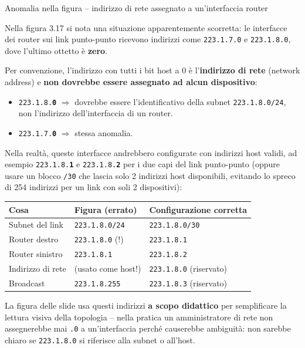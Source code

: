 \documentclass[a4paper,12pt]{report}
\begin{document}
\begin{notebox}{Anomalia nella figura -- indirizzo di rete
assegnato a un'interfaccia router}

Nella figura {3.17} si nota una situazione
apparentemente scorretta: le interfacce dei router sui link
punto-punto ricevono indirizzi come \texttt{223.1.7.0} e
\texttt{223.1.8.0}, dove l'ultimo ottetto è \textbf{zero}.

Per convenzione, l'indirizzo con tutti i bit host a 0 è
l'\textbf{indirizzo di rete} (network address) e
\textbf{non dovrebbe essere assegnato ad alcun dispositivo}:
\begin{itemize}
    \item \texttt{223.1.8.\textbf{0}} $\Rightarrow$ dovrebbe
          essere l'identificativo della subnet
          \texttt{223.1.8.0/24}, non l'indirizzo
          dell'interfaccia di un router.
    \item \texttt{223.1.7.\textbf{0}} $\Rightarrow$ stessa
          anomalia.
\end{itemize}

Nella realtà, queste interfacce andrebbero configurate con
indirizzi host validi, ad esempio \texttt{223.1.8.\textbf{1}}
e \texttt{223.1.8.\textbf{2}} per i due capi del link
punto-punto (oppure usare un blocco \texttt{/30} che lascia
solo 2 indirizzi host disponibili, evitando lo spreco di 254
indirizzi per un link con soli 2 dispositivi):

\begin{center}
\begin{tabular}{lll}
\toprule
\textbf{Cosa} & \textbf{Figura (errato)} &
\textbf{Configurazione corretta} \\
\midrule
Subnet del link    & \texttt{223.1.8.0/24}
                   & \texttt{223.1.8.0/30} \\
Router destro    & \texttt{223.1.8.0} (!)
                   & \texttt{223.1.8.1} \\
Router sinistro      & \texttt{223.1.8.1}
                   & \texttt{223.1.8.2} \\
Indirizzo di rete  & (usato come host!)
                   & \texttt{223.1.8.0} (riservato) \\
Broadcast          & \texttt{223.1.8.255}
                   & \texttt{223.1.8.3} (riservato) \\
\bottomrule
\end{tabular}
\end{center}

La figura delle slide usa questi indirizzi
\textbf{a scopo didattico} per semplificare la lettura
visiva della topologia -- nella pratica un amministratore
di rete non assegnerebbe mai \texttt{.0} a un'interfaccia
perché causerebbe ambiguità: non sarebbe chiaro se
\texttt{223.1.8.0} si riferisce alla subnet o all'host.
\end{notebox}
\end{document}
